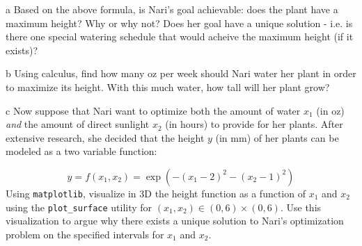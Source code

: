 \documentclass[expanded]{pset}
\begin{document}
\begin{parts}
  \begin{part}{a}
    Based on the above formula, is Nari's goal achievable: does the plant have a maximum height? Why or why not? Does her goal have a unique solution - i.e. is there one special watering schedule that would acheive the maximum height (if it exists)?

  \end{part}

  \begin{part}{b}
    Using calculus, find how many oz per week should Nari water her plant in order to maximize its height. With this much water, how tall will her plant grow?

  \end{part}

  \begin{part}{c}
    Now suppose that Nari want to optimize both the amount of water $x_1$ (in oz) \textit{and} the amount of direct sunlight $x_2$ (in hours) to provide for her plants. After extensive research, she decided that the height $y$ (in mm) of her plants can be modeled as a two variable function:

    $$y = f(x_1, x_2) = \exp\left(-(x_1 - 2)^2 - (x_2 - 1)^2 \right)$$
    Using \texttt{matplotlib}, visualize in 3D the height function as a function of $x_1$ and $x_2$ using the \texttt{plot\_surface} utility for $(x_1, x_2) \in (0, 6) \times (0, 6)$. 
    Use this visualization to argue why there exists a unique solution to Nari's optimization problem on the specified intervals for $x_1$ and $x_2$.
  \end{part}
\end{parts}
\end{document}

